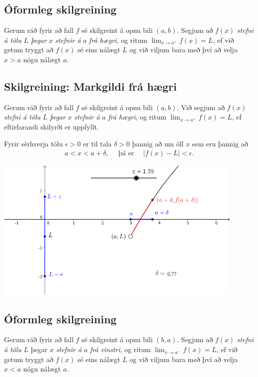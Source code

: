 \documentclass[b5paper,11pt,icelandic]{sphinxmanual}
\begin{document}
\subsection{Óformleg skilgreining}
\label{kafli02:oformleg-skilgreining}\label{kafli02:index-1}
Gerum ráð fyrir að fall \(f\) sé skilgreint á opnu bili
\((a,b)\). Segjum að \(f(x)\) \emph{stefni á tölu} \(L\) \emph{þegar}
\(x\) \emph{stefnir á} \(a\) \emph{frá hægri}, og ritum
\(\lim_{x\rightarrow a^+} f(x)=L\), ef við getum tryggt að
\(f(x)\) sé eins nálægt \(L\) og við viljum bara með því að
velja \(x>a\) nógu nálægt \(a\).


\subsection{Skilgreining: Markgildi frá hægri}
\label{kafli02:skilgreining-markgildi-fra-haegri}
Gerum ráð fyrir að fall \(f\) sé skilgreint á opnu bili
\((a,b)\). Við segjum að \(f(x)\) \emph{stefni á tölu} \(L\)
\emph{þegar} \(x\) \emph{stefnir á} \(a\) \emph{frá hægri}, og ritum
\(\lim_{x\rightarrow a^+} f(x)=L\), ef eftirfarandi skilyrði er
uppfyllt.

Fyrir sérhverja tölu \(\epsilon>0\) er til tala \(\delta>0\)
þannig að um öll \(x\) sem eru þannig að
\begin{equation*}
\begin{split}a<x<a+\delta,\quad \text{ þá er } \quad |f(x)-L| <\epsilon.\end{split}
\end{equation*}

\begin{center}
\includegraphics[width=12cm,keepaspectratio=true]{02_markfrahaegri.png}
\end{center}



\subsection{Óformleg skilgreining}
\label{kafli02:id2}\label{kafli02:index-2}
Gerum ráð fyrir að fall \(f\) sé skilgreint á opnu bili
\((b,a)\). Segjum að \(f(x)\) \emph{stefni á tölu} \(L\) þegar
\(x\) \emph{stefnir á} \(a\) \emph{frá vinstri}, og ritum
\(\lim_{x\rightarrow a^-} f(x)=L\), ef við getum tryggt að
\(f(x)\) sé eins nálægt \(L\) og við viljum bara með því að
velja \(x<a\) nógu nálægt \(a\).
\end{document}
